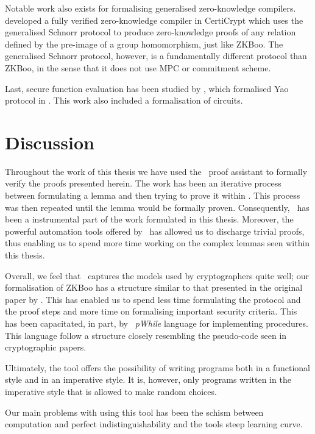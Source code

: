 Notable work also exists for formalising generalised zero-knowledge compilers.
\citet{zkcrypt} developed a fully verified zero-knowledge compiler in CertiCrypt
which uses the generalised Schnorr protocol to produce zero-knowledge proofs of
any relation defined by the pre-image of a group homomorphism, just like ZKBoo.
The generalised Schnorr protocol, however, is a fundamentally different protocol
than ZKBoo, in the sense that it does not use MPC or commitment scheme.

Last, secure function evaluation has been studied by \citet{Yao}, which
formalised Yao protocol in \easycrypt. This work also included a formalisation
of circuits.


\section{Discussion}
\label{sec:discussion}
Throughout the work of this thesis we have used the \easycrypt\ proof assistant
to formally verify the proofs presented herein.
The work has been an iterative process between formulating a lemma and then
trying to prove it within \easycrypt. This process was then repeated until the
lemma would be formally proven. Consequently, \easycrypt\ has been a
instrumental part of the work formulated in this thesis. Moreover, the powerful
automation tools offered by \easycrypt\ has allowed us to discharge trivial
proofs, thus enabling us to spend more time working on the complex lemmas seen
within this thesis.

Overall, we feel that \easycrypt\ captures the models used by cryptographers
quite well; our formalisation of ZKBoo has a structure similar to that presented
in the original paper by \citet{zkboo}. This has enabled us to spend less time
formulating the protocol and the proof steps and more time on formalising
important security criteria.
This has been capacitated, in part, by \easycrypt\ \textit{pWhile} language for
implementing procedures. This language follow a structure closely resembling the
pseudo-code seen in cryptographic papers.

Ultimately, the tool offers the possibility of writing programs both in a
functional style and in an imperative style. It is, however, only programs
written in the imperative style that is allowed to make random choices.

Our main problems with using this tool has been the schism between computation
and perfect indistinguishability and the tools steep learning curve.

